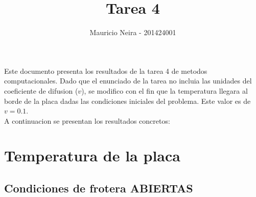 \documentclass{article}
\begin{document}
\title{Tarea 4}
\author{Mauricio Neira - 201424001}

\maketitle

Este documento presenta los resultados de la tarea 4 de metodos computacionales. Dado que el enunciado de la tarea
no incluia las unidades del coeficiente de difusion ($v$), se modifico con el
fin que la temperatura llegara al borde de la placa dadas las condiciones iniciales
del problema. Este valor es de $v = 0.1$.\\

A continuacion se presentan los resultados concretos:

\section{Temperatura de la placa}
\subsection{Condiciones de frotera ABIERTAS}
\end{document}
